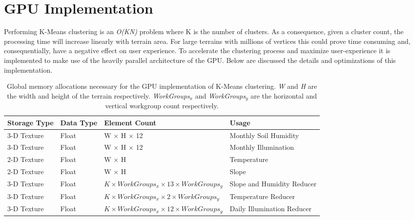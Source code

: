 \section{GPU Implementation}

Performing K-Means clustering is an \textit{O(KN)} problem where K is the number of clusters. As a consequence, given a cluster count, the processing time will increase linearly with terrain area. For large terrains with millions of vertices this could prove time consuming and, consequentially, have a negative effect on user experience. To accelerate the clustering process and maximize user-experience it is implemented to make use of the heavily parallel architecture of the GPU. Below are discussed the details and optimizations of this implementation. \\

\begin{table}[]
  \centering
	    \begin{tabular}{|p{3cm}|p{1.5cm}|p{6cm}|p{5cm}|}
		\hline	
  	    \textbf{Storage Type} &  \textbf{Data Type} & \textbf{Element Count} & \textbf{Usage} \\
		\hline
		3-D Texture & Float & W $\times$ H $\times$ 12 & Monthly Soil Humidity \\
		\hline
		3-D Texture & Float & W $\times$ H $\times$ 12 & Monthly Illumination \\
		\hline
		2-D Texture & Float & W $\times$ H & Temperature \\
		\hline
		2-D Texture & Float & W $\times$ H & Slope \\
		\hline
		3-D Texture & Float & $ \textit{K} \times WorkGroups_{x} \times 13 \times WorkGroups_{y} $ &  Slope and Humidity Reducer \\
		\hline
		3-D Texture & Float & $ \textit{K} \times WorkGroups_{x} \times 2 \times WorkGroups_{y} $ &  Temperature Reducer \\
		\hline
		3-D Texture & Float & $ \textit{K} \times WorkGroups_{x} \times 12 \times WorkGroups_{y} $ & Daily Illumination Reducer \\
		\hline
		\end{tabular}
		\caption{Global memory allocations necessary for the GPU implementation of K-Means clustering. \textit{W} and \textit{H} are the width and height of the terrain respectively. \textit{WorkGroups$_{x}$} and \textit{WorkGroups$_{y}$} are the horizontal and vertical workgroup count respectively.}
	  \label{tab:clustering_mem_allocs}
\end{table}

